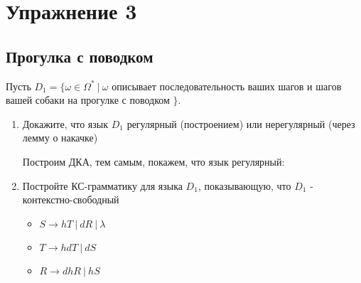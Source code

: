 \documentclass[a4paper,12pt]{article}
\begin{document}
\section{Упражнение 3}
 
    \subsection{Прогулка с поводком}
 
        Пусть $D_1 = \{\omega \in \Omega^* \: | \: \omega$ описывает последовательность ваших шагов и шагов вашей собаки на прогулке с поводком $\}$.
 
        \begin{enumerate}
            \item Докажите, что язык $D_1$ регулярный (построением) или нерегулярный (через лемму о накачке)
 
            Построим ДКА, тем самым, покажем, что язык регулярный:
            \begin{center}
            \end{center}  
 
            \item Постройте КС-грамматику для языка $D_1$, показывающую, что $D_1$ - контекстно-свободный
 
                \begin{itemize}
                    \item $S \to hT \: | \: dR \: | \: \lambda$
 
                    \item $T \to hdT \: | \: dS$
 
                    \item $R \to dhR \: | \: hS$
                \end{itemize}
 
 
        \end{enumerate}
 
\end{document}
